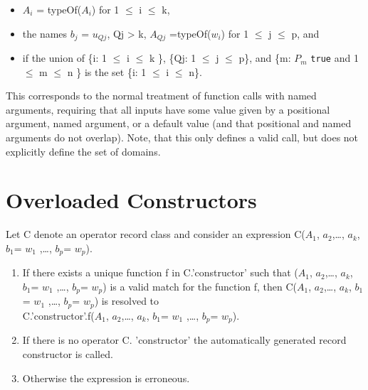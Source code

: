 \begin{itemize}
\item
  $A_{i}$ = typeOf($A_{i}$) for 1 $\le$ i $\le$ k,
\item
  the names $b_{j}$ = $u_{Qj}$, Qj \textgreater{}
  k, $A_{Qj}$ =typeOf($w_{i}$) for 1 $\le$ j $\le$ p, and
\item
  if the union of \{i: 1 $\le$ i $\le$ k \}, \{Qj: 1 $\le$ j $\le$ p\}, and \{m:
  $P_{m}$ \lstinline!true! and 1 $\le$ m $\le$ n \} is the set \{i: 1 $\le$
  i $\le$ n\}.
\end{itemize}

\begin{nonnormative}
This corresponds to the normal treatment of function calls with
named arguments, requiring that all inputs have some value given by a
positional argument, named argument, or a default value (and that
positional and named arguments do not overlap). Note, that this only
defines a valid call, but does not explicitly define the set of
domains.
\end{nonnormative}

\section{Overloaded Constructors}\label{overloaded-constructors}

Let C denote an operator record class and consider an expression
C($A_1$, $a_{2}$,\ldots{}, $a_{k}$,
$b_{1}$= $w_{1}$ ,\ldots{}, $b_{p}$=
$w_{p}$).

\begin{enumerate}
\item
  If there exists a {unique} function f in C.'constructor' such that
  ($A_1$, $a_{2}$,\ldots{}, $a_{k}$,
  $b_{1}$= $w_{1}$ ,\ldots{}, $b_{p}$=
  $w_{p}$) is a valid match for the function f, then
  C($A_1$, $a_{2}$,\ldots{}, $a_{k}$,
  $b_{1}$= $w_{1}$ ,\ldots{}, $b_{p}$=
  $w_{p}$) is resolved to\\
  C.'constructor'.f($A_1$, $a_{2}$,\ldots{},
  $a_{k}$, $b_{1}$= $w_{1}$ ,\ldots{},
  $b_{p}$= $w_{p}$).
\item
  If there is no operator C. 'constructor' the automatically generated
  record constructor is called.
\item
  Otherwise the expression is erroneous.
\end{enumerate}

